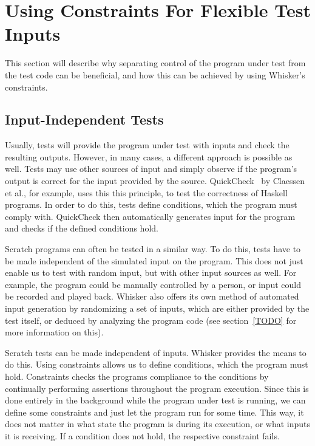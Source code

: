 \chapter{Using Constraints For Flexible Test Inputs}%
\label{cha:using_constraints_to_enable_flexible_test_inputs}

This section will describe why separating control of the program under test from the test code can be beneficial,
and how this can be achieved by using Whisker's constraints.

\section{Input-Independent Tests}

Usually, tests will provide the program under test with inputs and check the resulting outputs.
However, in many cases, a different approach is possible as well.
Tests may use other sources of input and simply observe if the program's output is correct for the input provided by the source.
QuickCheck~\cite{quickcheck} by Claessen et al., for example, uses this this principle, to test the correctness of Haskell programs.
In order to do this, tests define conditions, which the program must comply with.
QuickCheck then automatically generates input for the program and checks if the defined conditions hold.

Scratch programs can often be tested in a similar way.
To do this, tests have to be made independent of the simulated input on the program.
This does not just enable us to test with random input, but with other input sources as well.
For example, the program could be manually controlled by a person, or input could be recorded and played back.
Whisker also offers its own method of automated input generation by randomizing a set of inputs,
which are either provided by the test itself, or deduced by analyzing the program code (see section~\ref{TODO} for more information on this).

Scratch tests can be made independent of inputs.
Whisker provides the means to do this.
Using constraints allows us to define conditions, which the program must hold.
Constraints checks the programs compliance to the conditions by continually performing assertions throughout the program execution.
Since this is done entirely in the background while the program under test is running, we can define some constraints and just let the program run for some time.
This way, it does not matter in what state the program is during its execution, or what inputs it is receiving.
If a condition does not hold, the respective constraint fails.


